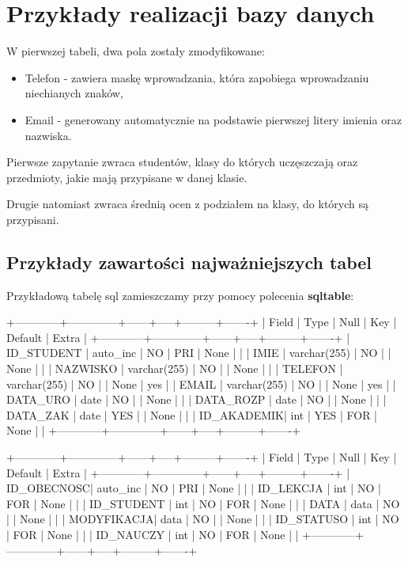 \documentclass[12pt,a4paper]{article}
\newenvironment{sqltable}%
{\snugshade\verbatim}%
{\endverbatim\endsnugshade}
\begin{document}
\section{Przykłady realizacji bazy danych}
\label{sec:ExamplesSection}
W pierwszej tabeli, dwa pola zostały zmodyfikowane:
\begin{itemize}
    \item Telefon - zawiera maskę wprowadzania, która zapobiega wprowadzaniu niechianych znaków,
    \item Email - generowany automatycznie na podstawie pierwszej litery imienia oraz nazwiska.
\end{itemize}
Pierwsze zapytanie zwraca studentów, klasy do których uczęszczają oraz przedmioty, jakie mają przypisane w danej klasie.
\newline

\noindent
Drugie natomiast zwraca średnią ocen z podziałem na klasy, do których są przypisani.

\subsection{Przykłady zawartości najważniejszych tabel}
\label{sec:ExampleTables}

Przykładową tabelę sql zamieszczamy przy pomocy polecenia \textbf{sqltable}:

\begin{sqltable}
+------------+--------------+------+-----+---------+-------+
| Field      | Type         | Null | Key | Default | Extra |
+------------+--------------+------+-----+---------+-------+
| ID_STUDENT | auto_inc	    | NO   | PRI | None    |       |
| IMIE 	    	| varchar(255) | NO   |     | None    |       |
| NAZWISKO   | varchar(255) | NO   |     | None    |       |
| TELEFON  	 | varchar(255) | NO   |     | None    |  yes  |
| EMAIL		     | varchar(255) | NO   |     | None    |  yes  |   
| DATA_URO	  | date   	     | NO   |     | None	   | 	     |  
| DATA_ROZP	 | date   	    	| NO   |     | None	   | 	     |
| DATA_ZAK	  | date   	    	| YES  |     | None	   | 	     |
| ID_AKADEMIK| int   	      | YES  | FOR | None	   | 	     |
+------------+--------------+------+-----+---------+-------+
\end{sqltable}

\begin{sqltable}
+------------+--------------+------+-----+---------+-------+
| Field      | Type         | Null | Key | Default | Extra |
+------------+--------------+------+-----+---------+-------+
| ID_OBECNOSC| auto_inc	    | NO   | PRI | None    |       |
| ID_LEKCJA	 | int		         | NO   | FOR | None    |       |
| ID_STUDENT | int		         | NO   | FOR | None    |       |
| DATA  	    | data		        | NO   |     | None    |   	   |
| MODYFIKACJA| data			        | NO   |     | None    |   	   |   
| ID_STATUSO | int   		      | NO   | FOR | None	   | 	     |  
| ID_NAUCZY	 | int   		      | NO   | FOR | None	   | 	     |
+------------+--------------+------+-----+---------+-------+
\end{sqltable}
\end{document}
